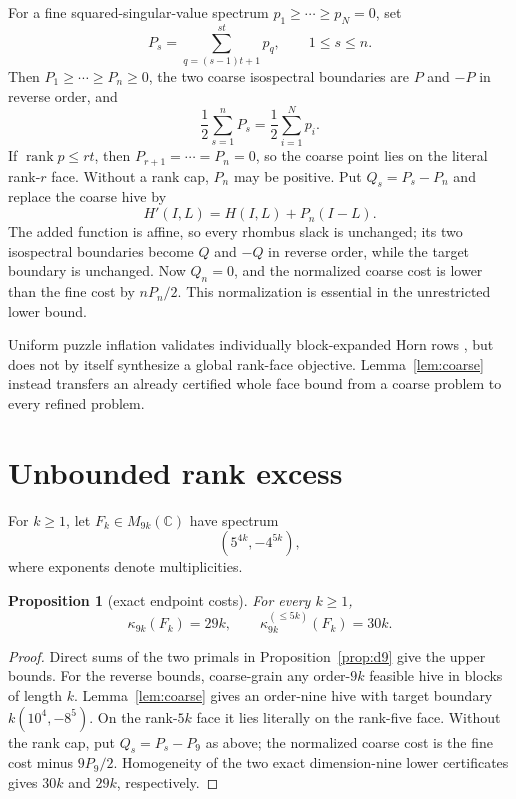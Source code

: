 \documentclass[11pt]{article}
\newtheorem{proposition}[theorem]{Proposition}
\newcommand{\rank}{\operatorname{rank}}
\begin{document}
For a fine squared-singular-value spectrum
$p_1\ge\cdots\ge p_N=0$, set
\begin{equation}
 P_s=\sum_{q=(s-1)t+1}^{st}p_q,\qquad1\le s\le n.
 \label{eq:blocksum}
\end{equation}
Then $P_1\ge\cdots\ge P_n\ge0$, the two coarse isospectral boundaries are
$P$ and $-P$ in reverse order, and
\[
 \frac12\sum_{s=1}^nP_s=\frac12\sum_{i=1}^Np_i.
\]
If $\rank p\le rt$, then $P_{r+1}=\cdots=P_n=0$, so the coarse point lies on
the literal rank-$r$ face.  Without a rank cap, $P_n$ may be positive.  Put
$Q_s=P_s-P_n$ and replace the coarse hive by
\[
 H'(I,L)=H(I,L)+P_n(I-L).
\]
The added function is affine, so every rhombus slack is unchanged; its two
isospectral boundaries become $Q$ and $-Q$ in reverse order, while the target
boundary is unchanged.  Now $Q_n=0$, and the normalized coarse cost is lower
than the fine cost by $nP_n/2$.  This normalization is essential in the
unrestricted lower bound.

Uniform puzzle inflation validates individually block-expanded Horn rows
\cite[Lemma~8]{ktw2004}, but does not by itself synthesize a global rank-face
objective.  Lemma~\ref{lem:coarse} instead transfers an already certified
whole face bound from a coarse problem to every refined problem.

\section{Unbounded rank excess}

For $k\ge1$, let $F_k\in M_{9k}(\mathbb C)$ have spectrum
\begin{equation}
 (5^{4k},-4^{5k}),
 \label{eq:amplified-family}
\end{equation}
where exponents denote multiplicities.

\begin{proposition}[exact endpoint costs]\label{prop:allk-cost}
For every $k\ge1$,
\[
 \kappa_{9k}(F_k)=29k,
 \qquad \kappa_{9k}^{(\le5k)}(F_k)=30k.
\]
\end{proposition}

\begin{proof}
Direct sums of the two primals in Proposition~\ref{prop:d9} give the upper
bounds.  For the reverse bounds, coarse-grain any order-$9k$ feasible hive in
blocks of length $k$.  Lemma~\ref{lem:coarse} gives an order-nine hive with
target boundary $k(10^4,-8^5)$.  On the rank-$5k$ face it lies literally on
the rank-five face.  Without the rank cap, put $Q_s=P_s-P_9$ as above; the
normalized coarse cost is the fine cost minus $9P_9/2$.  Homogeneity of the
two exact dimension-nine lower certificates gives $30k$ and $29k$,
respectively.
\end{proof}
\end{document}
